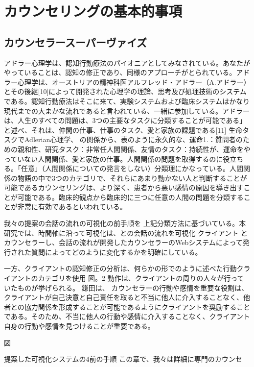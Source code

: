 \documentclass[shuuron]{kuee}
\begin{document}
\section{カウンセリングの基本的事項}
\subsection{カウンセラースーパーヴァイズ}

アドラー心理学は、認知行動療法のパイオニアとしてみなされている。あなたがやっていることは、認知の修正であり、同様のアプローチがとられている。アドラー心理学は、オーストリアの精神科医アルフレッド・アドラー（A.アドラー）とその後継[10]によって開発された心理学の理論、思考及び処理技術のシステムである。認知行動療法はそこに来て、実験システムおよび臨床システムはかなり現代までの大まかな流れであると言われている、一緒に参加している。アドラーは、人生のすべての問題は、3つの主要なタスクに分類することが可能である」と述べ、それは、仲間の仕事、仕事のタスク、愛と家族の課題である[11] 生命タスクでAdlerian心理学、 の関係から、表のように永久的な、運命1.：質問者のための親和性、研究タスク：非常任人間関係、友情のタスク：持続性が、運命をやっていない人間関係、愛と家族の仕事。人間関係の問題を取得するのに役立ちる。「任意」（人間関係についての発言をしない）分類理にかなっている。人間関係の物語の中で3つのカテゴリで、それらにあまり動かない人と判断することが可能であるカウンセリングは、より深く、患者から悪い感情の原因を導き出すことが可能である。臨床的観点から臨床的に三つに任意の人間の問題を分類することが非常に有効であるといわれている。

我々の提案の会話の流れの可視化の前手順を 上記分類方法に基づいている。本研究では、時間軸に沿って可視化は、との会話の流れを可視化 クライアント とカウンセラーし、会話の流れが開発したカウンセラーのWebシステムによって発行された質問によってどのように変化するかを明確にしている。

一方、クライアントの認知修正の分析は、何らかの形でのように述べた行動クライアントのカテゴリを使用 図。2 動作は、クライアントの周りの人々が行っていたものが挙げられる。 鎌田\cite{kamata2002}は、 カウンセラーの行動や感情を重要な役割は、クライアントが自己決意と自己責任を取ると不当に他人に介入することなく、他者との協力関係を形成することが可能であるようにクライアントを奨励することである。そのため、不当に他人の行動や感情に介入することなく、クライアント自身の行動や感情を見つけることが重要である。

図

提案した可視化システムの4前の手順
 この章で、我々は詳細に専門のカウンセ
\end{document}
